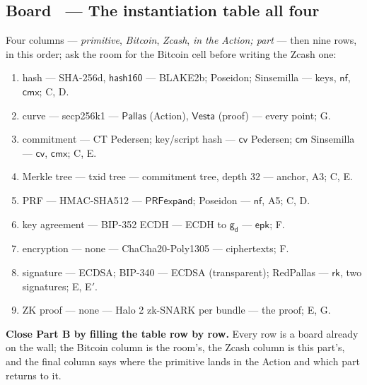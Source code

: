 \documentclass[11pt,a4paper]{article}
\makeatletter
\newcommand{\Pallas}{\ensuremath{\mathsf{Pallas}}}
\newcommand{\Vesta}{\ensuremath{\mathsf{Vesta}}}
\newcommand{\nfsym}{\ensuremath{\mathsf{nf}}}
\newcommand{\cmsym}{\ensuremath{\mathsf{cm}}}
\newcommand{\cmx}{\ensuremath{\mathsf{cmx}}}
\newcommand{\cvsym}{\ensuremath{\mathsf{cv}}}
\newcommand{\rksym}{\ensuremath{\mathsf{rk}}}
\newcommand{\gd}{\ensuremath{\mathsf{g_d}}}
\newcommand{\epk}{\ensuremath{\mathsf{epk}}}
\newcounter{board}
\newenvironment{board}[2]{\stepcounter{board}%
  \subsection*{Board \theboard\ --- #1 \hfill {\normalfont\small\color{arb}#2}}}{\medskip}
\newcommand{\Draw}{\draw@head{Draw}}
\newcommand{\Say}{\draw@head{Say}}
\makeatother
\begin{document}
\begin{board}{The instantiation table}{all four}
\Draw
Four columns --- \emph{primitive}, \emph{Bitcoin}, \emph{Zcash}, \emph{in
the Action; part} --- then nine rows, in this order; ask the room for the
Bitcoin cell before writing the Zcash one:
\begin{enumerate}
  \item hash --- SHA-256d, $\mathsf{hash160}$ --- BLAKE2b; Poseidon;
    Sinsemilla --- keys, $\nfsym$, $\cmx$; C, D.
  \item curve --- secp256k1 --- \Pallas{} (Action), \Vesta{} (proof) ---
    every point; G.
  \item commitment --- CT Pedersen; key/script hash --- $\cvsym$ Pedersen;
    $\cmsym$ Sinsemilla --- $\cvsym$, $\cmx$; C, E.
  \item Merkle tree --- txid tree --- commitment tree, depth $32$ ---
    anchor, A3; C, E.
  \item PRF --- HMAC-SHA512 --- $\mathsf{PRFexpand}$; Poseidon --- $\nfsym$,
    A5; C, D.
  \item key agreement --- BIP-352 ECDH --- ECDH to $\gd$ --- $\epk$; F.
  \item encryption --- none --- ChaCha20-Poly1305 --- ciphertexts; F.
  \item signature --- ECDSA; BIP-340 --- ECDSA (transparent); RedPallas ---
    $\rksym$, two signatures; E, E$'$.
  \item ZK proof --- none --- Halo 2 zk-SNARK per bundle --- the proof; E,
    G.
\end{enumerate}
\Say
\textbf{Close Part B by filling the table row by row.} Every row is a
board already on the wall; the Bitcoin column is the room's, the Zcash
column is this part's, and the final column says where the primitive
lands in the Action and which part returns to it.


\end{board}
\end{document}

